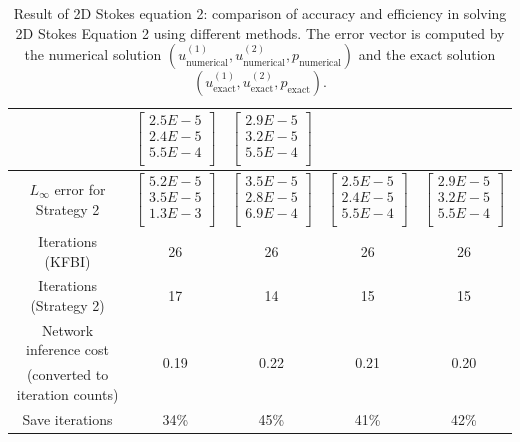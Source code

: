 \documentclass{article}
\begin{document}
\begin{table}[ht]
\begin{tabular}{|c|c|c|c|c|}
         &  $\begin{bmatrix} 2.5E-5 \\ 2.4E-5 \\ 5.5E-4 \\ \end{bmatrix}$ 
         &  $\begin{bmatrix} 2.9E-5 \\ 3.2E-5 \\ 5.5E-4 \\ \end{bmatrix}$ \\ \hline
         $L_{\infty}$ error for Strategy 2 
         &  $\begin{bmatrix} 5.2E-5 \\ 3.5E-5 \\ 1.3E-3 \\ \end{bmatrix}$ 
         &  $\begin{bmatrix} 3.5E-5 \\ 2.8E-5 \\ 6.9E-4 \\ \end{bmatrix}$ 
         &  $\begin{bmatrix} 2.5E-5 \\ 2.4E-5 \\ 5.5E-4 \\ \end{bmatrix}$ 
         &  $\begin{bmatrix} 2.9E-5 \\ 3.2E-5 \\ 5.5E-4 \\ \end{bmatrix}$ \\ \hline
         Iterations (KFBI) &  26&  26&26&       26\\ \hline 
         Iterations (Strategy 2) & 17&  14&15&15\\ \hline 
         
         Network inference cost
         & \multirow{2}{*}{0.19\bigstrut}
         & \multirow{2}{*}{0.22\bigstrut}
         & \multirow{2}{*}{0.21\bigstrut}
         & \multirow{2}{*}{0.20\bigstrut} \\
         (converted to iteration counts) & & & & \\ \hline
         
         Save iterations & 34\%& 45\%& 41\%& 42\%\\ \hline
    \end{tabular}
    \caption{Result of 2D Stokes equation 2: comparison of accuracy and efficiency in solving 2D Stokes Equation 2 using different methods. The error vector is computed by the numerical solution $(u_{\mbox{numerical}}^{(1)}, u_{\mbox{numerical}}^{(2)}, p_{\mbox{numerical}})$ and the exact solution $(u_{\mbox{exact}}^{(1)}, u_{\mbox{exact}}^{(2)}, p_{\mbox{exact}})$.}
    \label{label2_5}
\end{table}
\end{document}

